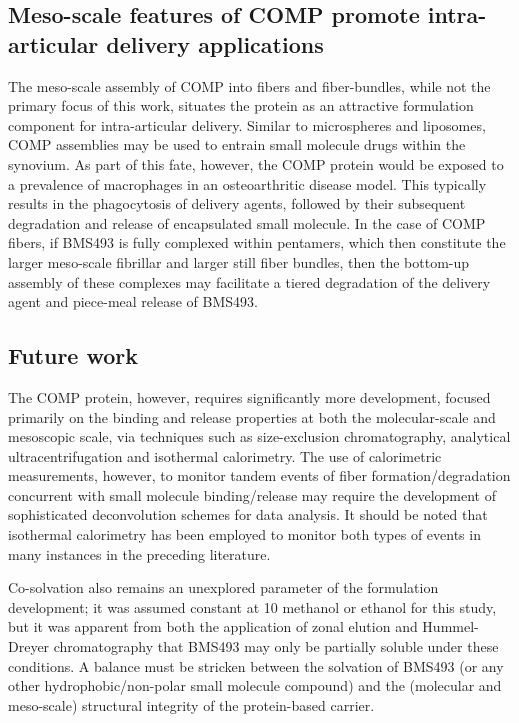 \begin{refsection}
\subsection{Meso-scale features of COMP promote intra-articular delivery
applications}
The meso-scale assembly of COMP into fibers and fiber-bundles, while not the
primary focus of this work, situates the protein as an attractive formulation
component for intra-articular delivery.\cite{Gerwin2006} Similar to
microspheres and liposomes, COMP assemblies may be used to entrain small
molecule drugs within the synovium. As part of this fate, however, the COMP
protein would be exposed to a prevalence of macrophages in an osteoarthritic
disease model. This typically results in the phagocytosis of delivery agents,
followed by their subsequent degradation and release of encapsulated small
molecule. In the case of COMP fibers, if BMS493 is fully complexed within
pentamers, which then constitute the larger meso-scale fibrillar and larger
still fiber bundles, then the bottom-up assembly of these complexes may
facilitate a tiered degradation of the delivery agent and piece-meal release of
BMS493.

\subsection{Future work}
The COMP protein, however, requires significantly more development, focused
primarily on the binding and release properties at both the molecular-scale and
mesoscopic scale, via techniques such as size-exclusion chromatography,
analytical ultracentrifugation and isothermal calorimetry. The use of
calorimetric measurements, however, to monitor tandem events of fiber
formation/degradation concurrent with small molecule binding/release may require
the development of sophisticated deconvolution schemes for data analysis. It
should be noted that isothermal calorimetry has been employed to monitor both
types of events in many instances in the preceding literature.\cite{Kardos2004}

Co-solvation also remains an unexplored parameter of the formulation
development; it was assumed constant at \SI{10}{\volper} methanol or ethanol for
this study, but it was apparent from both the application of zonal elution and
Hummel-Dreyer chromatography that BMS493 may only be partially soluble under
these conditions. A balance must be stricken between the solvation of BMS493 (or
any other hydrophobic/non-polar small molecule compound) and the (molecular and
meso-scale) structural integrity of the protein-based carrier.


\end{refsection}
